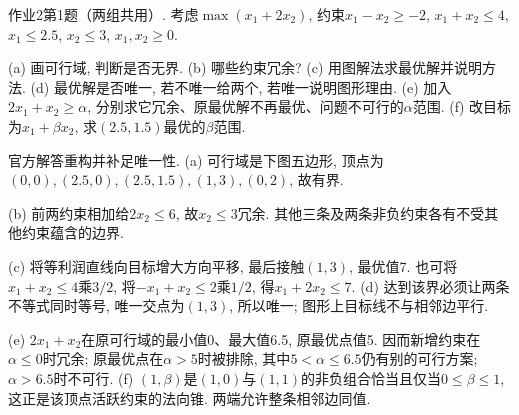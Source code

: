 \begin{exercise}\label{ass:15053-ps2-q1}
作业2第1题（两组共用）. 考虑$\max(x_1+2x_2)$, 约束$x_1-x_2\ge-2$, $x_1+x_2\le4$, $x_1\le2.5$, $x_2\le3$, $x_1,x_2\ge0$.

(a) 画可行域, 判断是否无界. (b) 哪些约束冗余? (c) 用图解法求最优解并说明方法. (d) 最优解是否唯一, 若不唯一给两个, 若唯一说明图形理由. (e) 加入$2x_1+x_2\ge\alpha$, 分别求它冗余、原最优解不再最优、问题不可行的$\alpha$范围. (f) 改目标为$x_1+\beta x_2$, 求$(2.5,1.5)$最优的$\beta$范围.
\end{exercise}
\begin{solution}
官方解答重构并补足唯一性. (a) 可行域是下图五边形, 顶点为$(0,0),(2.5,0),(2.5,1.5),(1,3),(0,2)$, 故有界.
\begin{center}\end{center}
(b) 前两约束相加给$2x_2\le6$, 故$x_2\le3$冗余. 其他三条及两条非负约束各有不受其他约束蕴含的边界.

(c) 将等利润直线向目标增大方向平移, 最后接触$(1,3)$, 最优值7. 也可将$x_1+x_2\le4$乘$3/2$, 将$-x_1+x_2\le2$乘$1/2$, 得$x_1+2x_2\le7$. (d) 达到该界必须让两条不等式同时等号, 唯一交点为$(1,3)$, 所以唯一; 图形上目标线不与相邻边平行.

(e) $2x_1+x_2$在原可行域的最小值0、最大值6.5, 原最优点值5. 因而新增约束在$\alpha\le0$时冗余; 原最优点在$\alpha>5$时被排除, 其中$5<\alpha\le6.5$仍有别的可行方案; $\alpha>6.5$时不可行. (f) $(1,\beta)$是$(1,0)$与$(1,1)$的非负组合恰当且仅当$0\le\beta\le1$, 这正是该顶点活跃约束的法向锥. 两端允许整条相邻边同值.
\end{solution}

